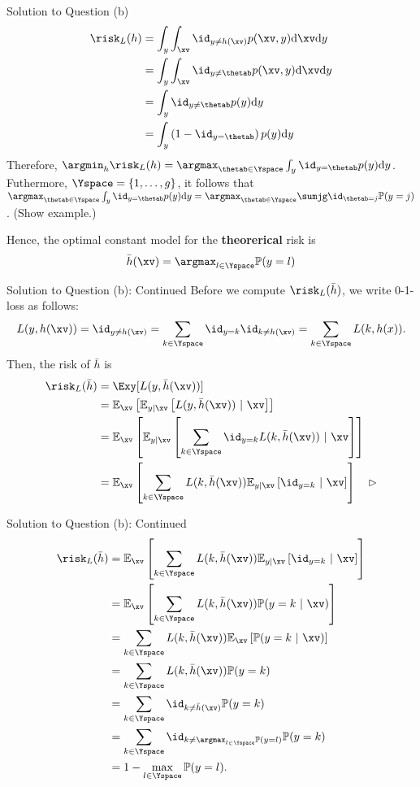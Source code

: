 \documentclass[aspectratio=169]{beamer}
\newcommand{\Ex}{\mathbb{E}_{\xv}}
\newcommand{\Eyx}{\mathbb{E}_{y|\xv}}
\newcommand{\Prob}{\mathbb{P}}
\begin{document}
\begin{frame}{Solution to Question (b)}
\small
	\begin{align*}
		\risk_L(h) &= \int_y \int_\xv \id_{y \neq h(\xv)} p(\xv, y) \mathrm{d}\xv \mathrm{d}y \\
		&= \int_y \int_\xv \id_{y \neq \thetab} p(\xv, y) \mathrm{d}\xv \mathrm{d}y \\
		&= \int_y \id_{y \neq \thetab} p(y) \mathrm{d}y \\
		&= \int_y \left( 1 - \id_{y = \thetab} \right) p(y) \mathrm{d}y 
	\end{align*}
Therefore, $\argmin_{h} \risk_L(h) = \argmax_{\thetab \in \Yspace} \int_y \id_{y = \thetab} p(y) \mathrm{d} y$. Futhermore, $\Yspace = \{1, \ldots, g\}$, 
it follows that $\argmax_{\thetab \in \Yspace} \int_y \id_{y = \thetab} p(y) \mathrm{d} y = \argmax_{\thetab \in \Yspace} \sumjg \id_{\thetab = j} \Prob (y=j)$. (Show example.)

Hence, the optimal constant model for the \textbf{theorerical} risk is 
$$\bar{h}(\xv) = \argmax_{l \in \Yspace} \Prob(y = l)$$
\end{frame}

\begin{frame}{Solution to Question (b): Continued}
	\small
	Before we compute $\risk_{L}(\bar{h})$, we write 0-1-loss as follows:
	$$L(y, h(\xv)) = \id_{y \neq h(\xv)} = \sum_{k \in \Yspace} \id_{y=k} \id_{k\neq h(\xv)} = \sum_{k \in \Yspace} L(k, h(x)).$$
	Then, the risk of $\bar{h}$ is 
	\begin{align*}
		\risk_L(\bar{h})
		&= \Exy[L(y, \bar{h}(\xv))] \\
		&= \Ex\left[ \Eyx \left[L(y, \bar{h}(\xv)) \ | \ \xv \right] \right] \\
		&= \Ex\left[ \Eyx \left[\sum_{k \in \Yspace} \id_{y=k} L(k, \bar{h}(\xv)) \ | \ \xv \right] \right] \\
		&= \Ex\left[ \sum_{k \in \Yspace} L(k, \bar{h}(\xv)) \Eyx \left[\id_{y=k}  \ | \ \xv \right] \right] \quad \rhd \\
	\end{align*}
\end{frame}

\begin{frame}{Solution to Question (b): Continued}
	\small
	\begin{align*}
		\risk_L(\bar{h})
		&= \Ex\left[ \sum_{k \in \Yspace} L(k, \bar{h}(\xv)) \Eyx \left[\id_{y=k}  \ | \ \xv \right] \right] \\
		&= \Ex\left[ \sum_{k \in \Yspace} L(k, \bar{h}(\xv)) \Prob(y = k \ | \ \xv) \right] \\
		&= \sum_{k \in \Yspace} L(k, \bar{h}(\xv)) \Ex \left[ \Prob(y = k \ | \ \xv) \right] \\
		& = \sum_{k \in \Yspace} L(k, \bar{h}(\xv)) \Prob(y = k) \\
		&= \sum_{k \in \Yspace} \id_{k \neq \bar{h}(\xv)} \Prob(y=k) \\
		&=  \sum_{k \in \Yspace} \id_{k \neq \argmax_{l \in \Yspace} \Prob(y=l)} \Prob(y=k) \\
		&= 1 - \max_{l \in \Yspace} \Prob(y=l).
	\end{align*}
\end{frame}
\end{document}
